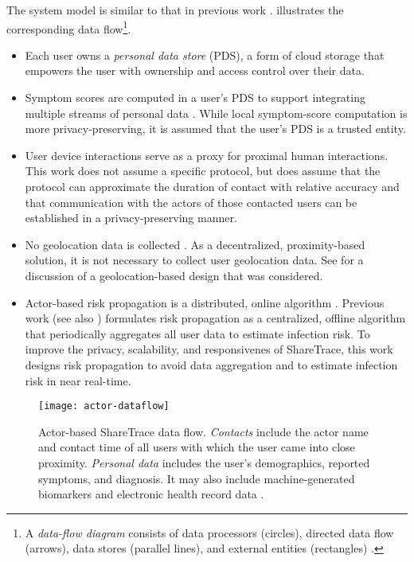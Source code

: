 The system model is similar to that in previous work \cite{Ayday2020,Ayday2021}.  illustrates the corresponding data flow\footnote{A \emph{data-flow diagram} consists of data processors (circles), directed data flow (arrows), data stores (parallel lines), and external entities (rectangles) \cite[pp. 437--438]{Fowler2004}\label{foot:dataflow}.}.
%
\begin{itemize}
    \item Each user owns a \emph{personal data store} (PDS), a form of cloud storage that empowers the user with ownership and access control over their data.
    \item Symptom scores are computed in a user's PDS to support integrating multiple streams of personal data \cite{Ayday2020}. While local symptom-score computation \cite{Ayday2020, Ayday2021} is more privacy-preserving, it is assumed that the user's PDS is a trusted entity.
    \item User device interactions serve as a proxy for proximal human interactions. This work does not assume a specific protocol, but does assume that the protocol can approximate the duration of contact with relative accuracy and that communication with the actors of those contacted users can be established in a privacy-preserving manner.
    \item No geolocation data is collected \cite{Ayday2020}. As a decentralized, proximity-based solution, it is not necessary to collect user geolocation data. See  for a discussion of a geolocation-based design that was considered.
    \item Actor-based risk propagation is a distributed, online algorithm \cite[pp. 791--818]{Cormen2022}. Previous work \cite{Ayday2020, Ayday2021} (see also ) formulates risk propagation as a centralized, offline algorithm that periodically aggregates all user data to estimate infection risk. To improve the privacy, scalability, and responsivenes of ShareTrace, this work designs risk propagation to avoid data aggregation and to estimate infection risk in near real-time.
\end{itemize}
%
\begin{figure}[htb]
    \texttt{[image: actor-dataflow]}
    \caption[Actor-based ShareTrace data flow]{Actor-based ShareTrace data flow. \emph{Contacts} include the actor name and contact time of all users with which the user came into close proximity. \emph{Personal data} includes the user's demographics, reported symptoms, and diagnosis. It may also include machine-generated biomarkers and electronic health record data
    \cite{Ayday2020}.}
    \label{fig:actor-dataflow}
\end{figure}

